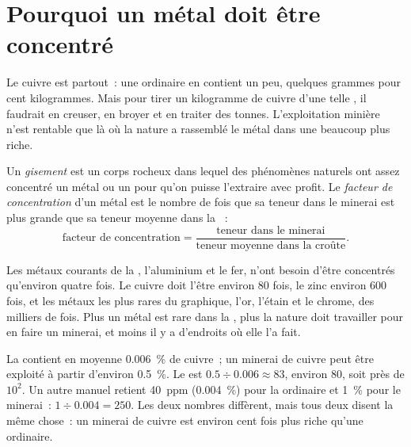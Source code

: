 \section{Pourquoi un métal doit être concentré}

Le cuivre est partout~: une  ordinaire en contient un peu, quelques
grammes pour cent kilogrammes. Mais pour tirer un kilogramme de cuivre
d'une telle , il faudrait en creuser, en broyer et en traiter des
tonnes. L'exploitation minière n'est rentable que là où la nature a
rassemblé le métal dans une  beaucoup plus riche.

\begin{definition}\label{def:g9:earth-resources:ore-deposit}
Un \emph{gisement} est un corps rocheux dans lequel des
phénomènes naturels ont assez concentré un métal ou un  pour qu'on
puisse l'extraire avec profit. Le \emph{facteur de concentration}
d'un métal est le nombre de fois que sa teneur dans le minerai est plus
grande que sa teneur moyenne dans la ~:
\[
\text{facteur de concentration} = \frac{\text{teneur dans le minerai}}{\text{teneur moyenne dans la croûte}} .
\]
\end{definition}

Les métaux courants de la , l'aluminium et le fer, n'ont besoin
d'être concentrés qu'environ quatre fois. Le cuivre doit l'être environ
80 fois, le zinc environ 600 fois, et les métaux les plus rares du
graphique, l'or, l'étain et le chrome, des milliers de fois. Plus un métal
est rare dans la , plus la nature doit travailler pour en faire un
minerai, et moins il y a d'endroits où elle l'a fait.

\begin{example}[Le cuivre]
La  contient en moyenne \qty{0.006}{\%} de cuivre~; un minerai de
cuivre peut être exploité à partir d'environ \qty{0.5}{\%}. Le  est $0.5 \div 0.006
\approx 83$, environ 80, soit près de $10^2$. Un autre manuel retient
\qty{40}{ppm} (\qty{0.004}{\%}) pour la  ordinaire et \qty{1}{\%}
pour le minerai~: $1 \div
0.004 = 250$. Les deux nombres diffèrent, mais tous deux disent la même
chose~: un minerai de cuivre est environ cent fois plus riche qu'une 
ordinaire.
\end{example}

